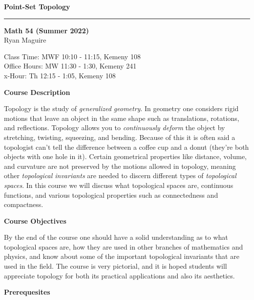 \documentclass{article}
\begin{document}
    \LARGE
    \textbf{Point-Set Topology}
    \hrule\par\hfill\par
    \normalsize
    \textbf{Math 54 (Summer 2022)}\\
    Ryan Maguire\\
    \color{gray}{Ryan.J.Maguire.GR@dartmouth.edu}
    \par\vspace{0.5cm}
    \color{black}
    Class Time: MWF 10:10 - 11:15, Kemeny 108\\
    Office Hours: MW 11:30 - 1:30, Kemeny 241\\
    x-Hour: Th 12:15 - 1:05, Kemeny 108
    \par\vspace{0.5cm}
    \textbf{Course Description}
    \par\hfill\par
    Topology is the study of \textit{generalized geometry}. In geometry one
    considers rigid motions that leave an object in the same shape such as
    translations, rotations, and reflections. Topology allows you to
    \textit{continuously deform} the object by stretching, twisting, squeezing,
    and bending. Because of this it is often said a topologist can't tell the
    difference between a coffee cup and a donut (they're both objects with
    one hole in it). Certain geometrical properties like distance, volume,
    and curvature are not preserved by the motions allowed in topology,
    meaning other \textit{topological invariants} are needed to discern
    different types of \textit{topological spaces}. In this course we will
    discuss what topological spaces are, continuous functions, and various
    topological properties such as connectedness and compactness.
    \par\hfill\par
    \textbf{Course Objectives}
    \par\hfill\par
    By the end of the course one should have a solid understanding as to what
    topological spaces are, how they are used in other branches of mathematics
    and physics, and know about some of the important topological invariants
    that are used in the field. The course is very pictorial, and it is hoped
    students will appreciate topology for both its practical applications and
    also its aesthetics.
    \par\hfill\par
    \textbf{Prerequesites}
    \par\hfill\par
\end{document}
